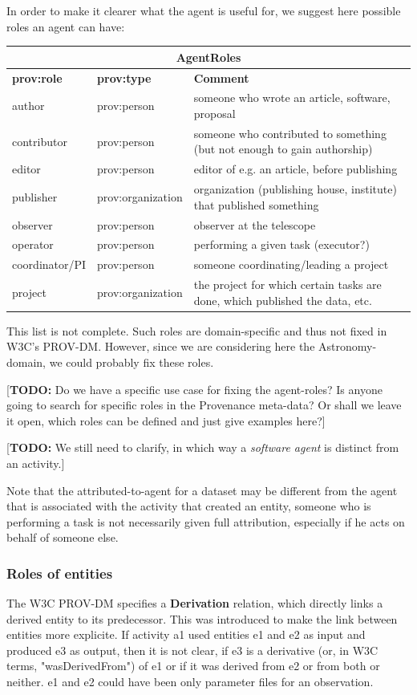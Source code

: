 \documentclass[11pt,a4paper]{ivoa}
\newcommand{\TODO}[1]{\noindent \textcolor{todocolor}{[\textbf{TODO:} #1]}}
\begin{document}
In order to make it clearer what the agent is useful for, we suggest here possible roles an agent can have:\\
\begin{center}
\begin{tabular}{l|l|p{}}
\multicolumn{3}{c}{\textbf{AgentRoles}}\\ \hline
\textbf{prov:role} & \textbf{prov:type} & \textbf{Comment} \\ \hline
author & prov:person & someone who wrote an article, software, proposal\\
contributor & prov:person & someone who contributed to something (but not enough to gain authorship)\\
editor & prov:person & editor of e.g. an article, before publishing\\
publisher & prov:organization & organization (publishing house, institute) that published something\\
observer & prov:person & observer at the telescope\\
operator & prov:person & performing a given task (executor?)\\
coordinator/PI & prov:person & someone coordinating/leading a project\\
project & prov:organization & the project for which certain tasks are done, which published the data, etc.\\
\end{tabular}
\end{center}
This list is not complete. 
Such roles are domain-specific and thus not fixed in W3C's PROV-DM. However, since we are considering here the Astronomy-domain, we could 
probably fix these roles. 

\TODO{Do we have a specific use case for fixing the agent-roles? Is anyone going to search for specific roles in the Provenance meta-data?
Or shall we leave it open, which roles can be defined and just give examples here?}


\TODO{We still need to clarify, in which way a \emph{software agent} is distinct from an activity.}

Note that the attributed-to-agent for a dataset may be different from the agent that is associated with the activity that created an entity, someone who is performing a task is not necessarily given full attribution, especially if he acts on behalf of someone else.






\subsubsection{Roles of entities}
The W3C PROV-DM specifies a \textbf{Derivation} relation, which directly links a derived entity to its predecessor. This was introduced to make the link between entities more explicite. If activity a1 used entities e1 and e2 as input and produced e3 as output, then it is not clear, if e3 is a derivative (or, in W3C terms, "wasDerivedFrom") of e1 or if it was derived from e2 or from both or neither. e1 and e2 could have been only parameter files for an observation.  
\end{document}
